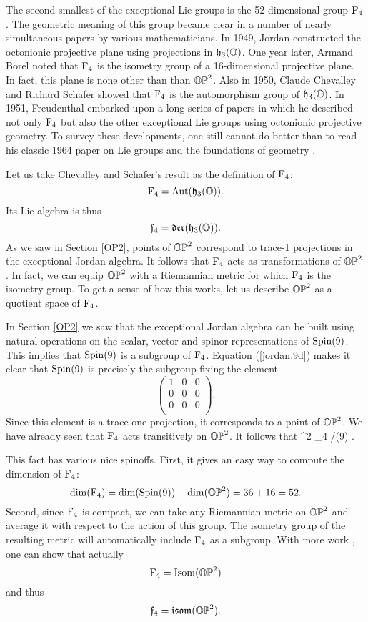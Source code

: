 The second smallest of the exceptional Lie groups is the 52-dimensional
group ${\rm F}_4$.  The geometric meaning of this group became clear in a
number of nearly simultaneous papers by various mathematicians.  In
1949, Jordan constructed the octonionic projective plane using
projections in ${\mathfrak {h}}_3({\mathbb O})$.   One year later, Armand Borel \cite{Borel}
noted that ${\rm F}_4$ is the isometry group of a 16-dimensional projective
plane.  In fact, this plane is none other than than ${\mathbb {OP}}^2$.   Also
in 1950, Claude Chevalley and Richard Schafer \cite{CS} showed that
${\rm F}_4$ is the automorphism group of ${\mathfrak {h}}_3({\mathbb O})$.   In 1951, Freudenthal
\cite{Freudenthal4} embarked upon a long series of papers in which he
described not only ${\rm F}_4$ but also the other exceptional Lie groups
using octonionic projective geometry.  To survey these developments, one
still cannot do better than to read his classic 1964 paper on Lie groups
and the foundations of geometry \cite{Freudenthal3}.

Let us take Chevalley and Schafer's result as the definition of ${\rm F}_4$:
\[     {\rm F}_4 = {\rm Aut}({\mathfrak {h}}_3({\mathbb O}))  .\]
Its Lie algebra is thus
\[   {\mathfrak {f}}_4 = {\mathfrak {der}}({\mathfrak {h}}_3({\mathbb O})).     \label{f4.1}  \]
As we saw in Section \ref{OP2}, points of ${\mathbb {OP}}^2$ correspond to trace-1
projections in the exceptional Jordan algebra.  It follows that ${\rm F}_4$
acts as transformations of ${\mathbb {OP}}^2$.  In fact, we can equip ${\mathbb {OP}}^2$ with
a Riemannian metric for which ${\rm F}_4$ is the isometry group. To get a
sense of how this works, let us describe ${\mathbb {OP}}^2$ as a quotient space of
${\rm F}_4$.   

In Section \ref{OP2} we saw that the exceptional Jordan algebra can
be built using natural operations on the scalar, vector and spinor
representations of ${\rm Spin}(9)$.  This implies that ${\rm Spin}(9)$ is a
subgroup of ${\rm F}_4$.  Equation (\ref{jordan.9d}) makes it clear that
${\rm Spin}(9)$ is precisely the subgroup fixing the element
 \[   \left( \begin{array}{ccc} 1 & 0 & 0 \\  
                                0 & 0 & 0 \\  
                                0 & 0 & 0 \\  
\end{array} \right).  \]  
Since this element is a trace-one projection, it corresponds to a point
of ${\mathbb {OP}}^2$.  We have already seen that ${\rm F}_4$ acts transitively on 
${\mathbb {OP}}^2$.  It follows that
\be     \OP^2 \iso \F_4 /\Spin(9)  . \label{F4/Spin(9)} \ee
  
This fact has various nice spinoffs.  First, it gives an easy way to  
compute the dimension of ${\rm F}_4$:  
\[    \dim({\rm F}_4) = \dim({\rm Spin}(9)) + \dim({\mathbb {OP}}^2) =  
36 + 16 = 52.\]  
Second, since ${\rm F}_4$ is compact, we can take any Riemannian metric on ${\mathbb {OP}}^2$ 
and average it with respect to the action of this group.  The isometry
group of the resulting metric will automatically include ${\rm F}_4$ as a
subgroup.  With more work \cite{Besse}, one can show that actually
\[     {\rm F}_4 = {\rm Isom}({\mathbb {OP}}^2) \]
and thus
\[   {\mathfrak {f}}_4 = {\mathfrak {isom}}({\mathbb {OP}}^2).     \label{f4.2}  \]


